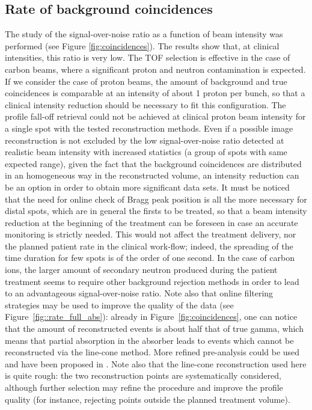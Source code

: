 \subsection{Rate of background coincidences}
The study of the signal-over-noise ratio as a function of beam intensity was performed (see Figure \ref{fig:coincidences}). The results show that, at clinical intensities, this ratio is very low. The TOF selection is effective in the case of carbon beams, where a significant proton and neutron contamination is expected. If we consider the case of proton beams, the amount of background and true coincidences is comparable at an intensity of about 1 proton per bunch, so that a clinical intensity reduction should be necessary to fit this configuration. The profile fall-off retrieval could not be achieved at clinical proton beam intensity for a single spot with the tested reconstruction methods. Even if a possible image reconstruction is not excluded by the low signal-over-noise ratio detected at realistic beam intensity with increased statistics (a group of spots with same expected range), given the fact that the background coincidences are distributed in an homogeneous way in the reconstructed volume, an intensity reduction can be an option in order to obtain more significant data sets. It must be noticed that the need for online check of Bragg peak position is all the more necessary for distal spots, which are in general the firsts to be treated, so that a beam intensity reduction at the beginning of the treatment can be foreseen in case an accurate monitoring is strictly needed. This would not affect the treatment delivery, nor the planned patient rate in the clinical work-flow; indeed, the spreading of the time duration for few spots is of the order of one second. 
In the case of carbon ions, the larger amount of secondary neutron produced during the patient treatment seems to require other background rejection methods in order to lead to an advantageous signal-over-noise ratio. Note also that online filtering strategies may be used to improve the quality of the data (see Figure~\ref{fig::rate_full_abs}): already in Figure~\ref{fig:coincidences}, one can notice that the amount of reconstructed events is about half that of true gamma, which means that partial absorption in the absorber leads to events which cannot be reconstructed via the line-cone method. More refined pre-analysis could be used and have been proposed in \cite{Draeger:2017aa}. Note also that the line-cone reconstruction used here is quite rough: the two reconstruction points are systematically considered, although further selection may refine the procedure and improve the profile quality (for instance, rejecting points outside the planned treatment volume).

